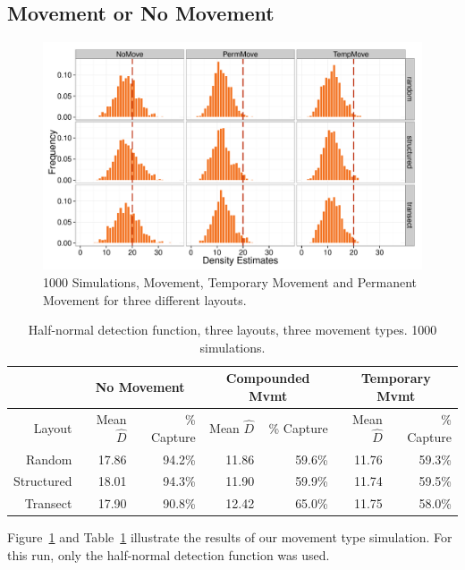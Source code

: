 \documentclass[12pt]{article}
\begin{document}
\subsection{Movement or No Movement}
\begin{figure}

	\includegraphics[width=\textwidth]{../images/MovementSim2.pdf}
	\caption{1000 Simulations, Movement, Temporary Movement and Permanent Movement for three different layouts. \label{fig:sim2}}
		
\end{figure}
\begin{table}
	\caption{Half-normal detection function, three layouts, three movement types. 1000 simulations.}
	\begin{tabular}{ r| r r| r r| r r|}
	
		& \multicolumn{2}{|c|}{No Movement}	& \multicolumn{2}{|c|}{Compounded Mvmt}	& \multicolumn{2}{|c|}{Temporary Mvmt}\\ 
 \hline \hline
 
 Layout		& Mean $\hat{D}$	& \% Capture & Mean $\hat{D}$ & \% Capture & Mean $\hat{D}$ & \% Capture	\\ \hline \hline
 Random		& 17.86 			& 94.2\% 		& 11.86	& 59.6\%	& 11.76	& 59.3\% \\
 Structured	& 18.01 			& 94.3\% 		& 11.90 & 59.9\% 	& 11.74 & 59.5\% \\
 Transect	& 17.90 			& 90.8\% 		& 12.42 & 65.0\% 	& 11.75 & 58.0\% \\ \hline

	\end{tabular}
	\label{table:sim2}
\end{table}

Figure~\ref{fig:sim2} and Table~\ref{table:sim2} illustrate the results of our movement type simulation. For this run, only the half-normal detection function was used. 
\end{document}

